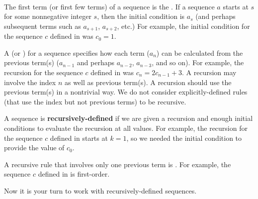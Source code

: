 \begin{defn}
~
    \begin{apart}
        \item The first term (or first few terms) of a sequence is the .  If a sequence $a$ starts at $s$ for some nonnegative integer $s$, then the initial condition is $a_s$ (and perhaps subsequent terms such as $a_{s+1}$, $a_{s+2}$, etc.)  For example, the initial condition for the sequence $c$ defined in  was $c_0=1$.
        \item A  (or ) for a sequence specifies how each term ($a_n$) can be calculated from the previous term(s) ($a_{n-1}$ and perhaps $a_{n-2}$, $a_{n-3}$, and so on). For example, the recursion for the sequence $c$ defined in  was $c_n=2c_{n-1}+3$.  A recursion may involve the index $n$ as well as previous term(s). A recursion should use the previous term(s) in a nontrivial way. We do not consider explicitly-defined rules (that use the index but not previous terms) to be recursive.
        \item A sequence is \textbf{recursively-defined} if we are given a recursion and enough initial conditions to evaluate the recursion at all values.  For example, the recursion for the sequence $c$ defined in  starts at $k=1$, so we needed the initial condition to provide the value of $c_0$.
        \item A recursive rule that involves only one previous term is .  For example, the sequence $c$ defined in  is first-order.
    \end{apart}
\end{defn}

Now it is your turn to work with recursively-defined sequences.

